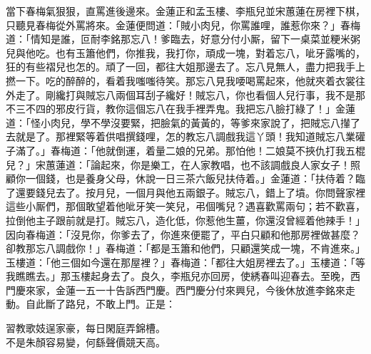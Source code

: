 當下春梅氣狠狠，直罵進後邊來。金蓮正和孟玉樓、李瓶兒並宋蕙蓮在房裡下棋，只聽見春梅從外罵將來。金蓮便問道：「賊小肉兒，你罵誰哩，誰惹你來？」春梅道：「情知是誰，叵耐李銘那忘八！爹臨去，好意分付小厮，留下一桌菜並粳米粥兒與他吃。也有玉簫他們，你推我，我打你，頑成一塊，對着忘八，呲牙露嘴的，狂的有些褶兒也怎的。頑了一回，都往大姐那邊去了。忘八見無人，盡力把我手上撚一下。吃的醉醉的，看着我嗤嗤待笑。{}那忘八見我喓喝罵起來，他就夾着衣裳往外走了。剛纔打與賊忘八兩個耳刮子纔好！賊忘八，你也看個人兒行事，我不是那不三不四的邪皮行貨，教你這個忘八在我手裡弄鬼。我把忘八臉打綠了！」金蓮道：「怪小肉兒，學不學沒要緊，把臉氣的黃黃的，等爹來家說了，把賊忘八攆了去就是了。那裡緊等着供唱撰錢哩，{}怎的教忘八調戲我這丫頭！我知道賊忘八業礶子滿了。」春梅道：「他就倒運，着量二娘的兄弟。{}那怕他！二娘莫不挾仇打我五棍兒？」宋蕙蓮道：「論起來，你是樂工，在人家教唱，也不該調戲良人家女子！照顧你一個錢，也是養身父母，休說一日三茶六飯兒扶侍着。」金蓮道：「扶侍着？臨了還要錢兒去了。按月兒，一個月與他五兩銀子。賊忘八，錯上了墳。你問聲家裡這些小厮們，那個敢望着他呲牙笑一笑兒，弔個嘴兒？遇喜歡罵兩句；若不歡喜，拉倒他主子跟前就是打。賊忘八，造化低，你惹他生薑，你還沒曾經着他辣手！」{}因向春梅道：「沒見你，你爹去了，你進來便罷了，平白只顧和他那房裡做甚麼？卻教那忘八調戲你！」春梅道：「都是玉簫和他們，只顧還笑成一塊，不肯進來。」玉樓道：「他三個如今還在那屋裡？」春梅道：「都往大姐房裡去了。」玉樓道：「等我瞧瞧去。」那玉樓起身去了。良久，李瓶兒亦回房，使綉春叫迎春去。至晚，西門慶來家，金蓮一五一十告訴西門慶。西門慶分付來興兒，今後休放進李銘來走動。自此斷了路兒，不敢上門。正是：

\begin{myquote} 
習教歌妓逞家豪，每日閑庭弄錦槽。\\不是朱顏容易變，何繇聲價競天高。
\end{myquote} 

